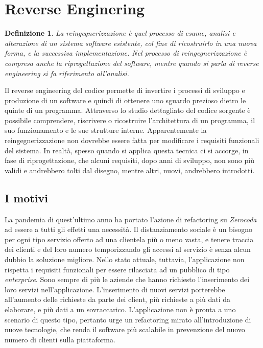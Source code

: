 \section{Reverse Enginering}
\newtheorem*{def:reverseengineering}{Definizione}
\begin{def:reverseengineering}
    La reingegnerizzazione è quel processo di esame, analisi e alterazione di un sistema software esistente, col fine di ricostruirlo in una nuova forma, e la successiva implementazione. \cite{chikofsky:reverseengineering} Nel processo di reingegnerizzazione è compresa anche la riprogettazione del software, mentre quando si parla di reverse engineering si fa riferimento all'analisi.
\end{def:reverseengineering}
Il reverse engineering del codice permette di invertire i processi di sviluppo e produzione di un software e quindi di ottenere uno sguardo prezioso dietro le quinte di un programma. Attraverso lo studio dettagliato del codice sorgente è possibile comprendere, riscrivere o ricostruire l’architettura di un programma, il suo funzionamento e le sue strutture interne. Apparentemente la reingegnerizzazione non dovrebbe essere fatta per modificare i requisiti funzionali del sistema. In realtà, spesso quando si applica questa tecnica ci si accorge, in fase di riprogettazione, che alcuni requisiti, dopo anni di sviluppo, non sono più validi e andrebbero tolti dal disegno, mentre altri, nuovi, andrebbero introdotti.

\subsection{I motivi}
La pandemia di quest'ultimo anno ha portato l'azione di refactoring su \emph{Zerocoda} ad essere a tutti gli effetti una necessità. Il distanziamento sociale è un bisogno per ogni tipo servizio offerto ad una clientela più o meno vasta, e tenere traccia dei clienti e del loro numero temporizzando gli accessi al servizio è senza alcun dubbio la soluzione migliore. Nello stato attuale, tuttavia, l'applicazione non rispetta i requisiti funzionali per essere rilasciata ad un pubblico di tipo \emph{enterprise}. Sono sempre di più le aziende che hanno richiesto l'inserimento dei loro servizi nell'applicazione. L'inserimento di nuovi servizi porterebbe all'aumento delle richieste da parte dei client, più richieste a più dati da elaborare, e più dati a un sovraccarico. L'applicazione non è pronta a uno scenario di questo tipo, pertanto urge un refactoring mirato all'introduzione di nuove tecnologie, che renda il software più scalabile in prevenzione del nuovo numero di clienti sulla piattaforma.

